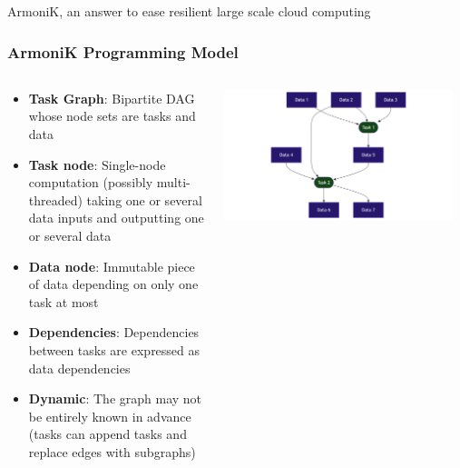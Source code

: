\documentclass[10pt,aspectratio=1609]{beamer}
\begin{document}
\begin{section}{ArmoniK, an answer to ease resilient large scale cloud computing}
  \begin{frame}
    \frametitle{ArmoniK Programming Model}
    \begin{columns}[T]
      \begin{column}{0.5\textwidth}
        \begin{itemize}
          \item \textbf{Task Graph}: Bipartite DAG whose node sets are tasks and data
          \item \textbf{Task node}: Single-node computation (possibly multi-threaded) taking one or several data inputs and outputting one or several data
          \item \textbf{Data node}: Immutable piece of data depending on only one task at most
          \item \textbf{Dependencies}: Dependencies between tasks are expressed as data dependencies
          \item \textbf{Dynamic}: The graph may not be entirely known in advance (tasks can append tasks and replace edges with subgraphs)
        \end{itemize}
      \end{column}
      \begin{column}{0.5\textwidth}
        \centering
        \includegraphics[width=0.95\textwidth]{mermaid-task-graph.png}
      \end{column}
    \end{columns}
  \end{frame}


\end{section}
\end{document}
